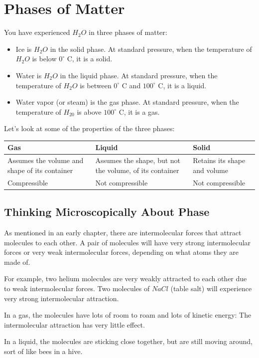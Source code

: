 \chapter{Phases of Matter}

You have experienced $H_2O$ in three phases of matter:
\begin{itemize}
\item Ice is $H_2O$ in the solid phase. At standard pressure, when the temperature of $H_2O$ is below $0^\circ$ C, it is a solid. 
\item Water is $H_2O$ in the liquid phase. At standard pressure, when the temperature of $H_2O$ is between $0^\circ$ C and $100^\circ$ C, it is a liquid.
\item Water vapor (or steam) is the gas phase. At standard pressure, when the temperature of $H_20$ is above $100^\circ$ C, it is a gas.
\end{itemize}

Let's look at some of the properties of the three phases:

\begin{tabular}{p{5cm}|p{5cm}|p{5cm}}
Gas & Liquid & Solid \\
\hline
Assumes the volume and shape of its container & 
Assumes the shape, but not the volume, of its container &
Retains its shape and volume \\
\hline
Compressible & Not compressible & Not compressible \\
\end{tabular}

\section{Thinking Microscopically About Phase}

As mentioned in an early chapter, there are intermolecular forces that attract molecules to each
other. A pair of molecules will have very strong intermolecular forces or very weak intermolecular forces,
depending on what atoms they are made of.

For example, two helium molecules are very weakly attracted to each other due to weak intermolecular forces.  Two molecules of $NaCl$ (table salt) will experience very strong intermolecular attraction.

In a gas, the molecules have lots of room to roam and lots of kinetic energy: The intermolecular attraction has very little effect.

In a liquid, the molecules are sticking close together, but are still moving around, sort of like bees in a hive.

